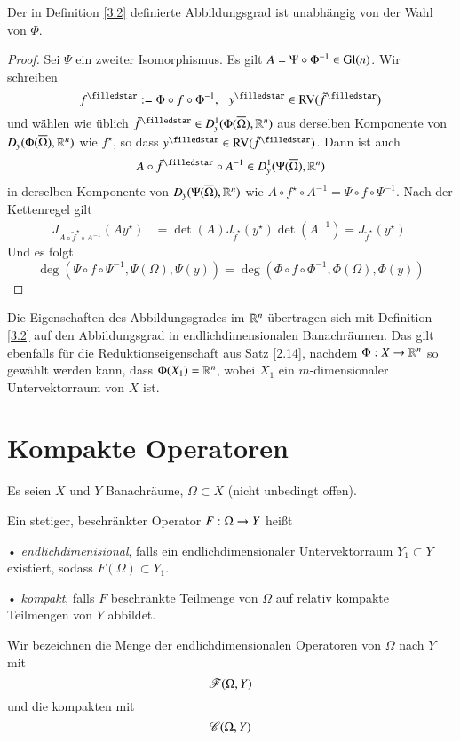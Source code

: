 \begin{prop}\label{3.3}
    Der in Definition \ref{3.2} definierte Abbildungsgrad ist unabhängig von der Wahl von $\Phi$.
\end{prop}

\begin{proof}
    Sei $\Psi$ ein zweiter Isomorphismus. Es gilt $A=\Psi\circ\Phi^{-1}\in \mathrm{Gl}(n)$. Wir schreiben
    \[
        f^\star:=\Phi \circ f \circ \Phi^{-1}, \qq y^\star\in \RV(\tilde f^\star)
    \]
    und wählen wie üblich $\tilde f^\star\in D^1_y(\Phi(\ol\Omega),\R^n)$ aus derselben Komponente von
    $D_y(\Phi(\overline \Omega),\mathbb{R}^n)$ wie $f^\star$, so dass $y^\star\in \RV(\tilde f^\star)$. Dann ist auch
    \[
        A\circ \tilde f^\star \circ A^{-1}\in D^1_y(\Psi (\ol \Omega),\R^n)
    \]
    in derselben Komponente von $D_y(\Psi(\overline \Omega),\mathbb{R}^n)$ wie $A\circ f^\star\circ A^{-1}=\Psi\circ
    f\circ \Psi^{-1}$.
    Nach der Kettenregel gilt
    \begin{align*}
        J_{A\circ \tilde f^\star\circ A^{-1}}(Ay^\star)&= \det(A) J_{\tilde f^\star}(y^\star)
        \det(A^{-1})=J_{\tilde f^\star} (y^\star).
    \end{align*}
    Und es folgt
    \[ 
        \deg(\Psi\circ f \circ\Psi^{-1},\Psi(\Omega),\Psi(y))
        = \deg(\Phi\circ f \circ\Phi^{-1},\Phi(\Omega),\Phi(y))
    \]
\end{proof}

Die Eigenschaften des Abbildungsgrades im $\mathbb{R}^n$ übertragen sich mit Definition \ref{3.2} auf den
Abbildungsgrad in endlichdimensionalen Banachräumen. Das gilt ebenfalls für die Reduktionseigenschaft aus
Satz \ref{2.14}, nachdem $\Phi:X\rightarrow\mathbb{R}^n$ so gewählt werden kann, dass $\Phi(X_1)=\mathbb{R}^n$, wobei $X_1$ ein
$m$-dimensionaler Untervektorraum von $X$ ist.

\section{Kompakte Operatoren}

Es seien $X$ und $Y$ Banachräume, $\Omega\subset X$ (nicht unbedingt offen).

\begin{defi}
    Ein stetiger, beschränkter Operator $F:\Omega\rightarrow Y$ heißt
    \begin{description}
        \item{•} \textit{endlichdimenisional}, falls ein endlichdimensionaler Untervektorraum $Y_1\subset Y$
        existiert, sodass $F(\Omega)\subset Y_1$.
        \item{•} \textit{kompakt}, falls $F$ beschränkte Teilmenge von $\Omega$ auf relativ kompakte
        Teilmengen von $Y$ abbildet.
    \end{description}
    Wir bezeichnen die Menge der endlichdimensionalen Operatoren von $\Omega$ nach $Y$ mit
    \[
        \mathscr F(\Omega,Y)
    \]
    und die kompakten mit
    \[
        \mathscr C(\Omega,Y)
    \]
\end{defi}

